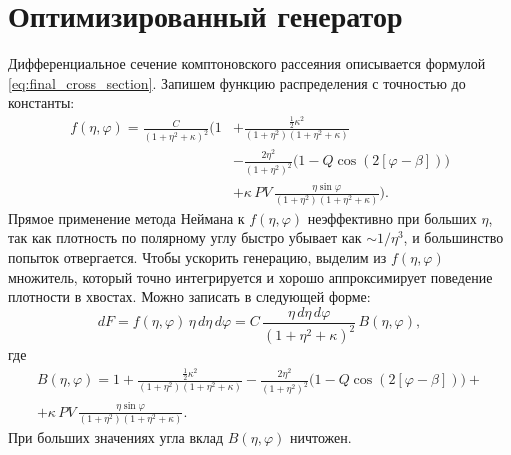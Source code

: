 \documentclass[14pt, a4paper]{extreport}
\begin{document}
\section{Оптимизированный генератор}
Дифференциальное сечение комптоновского рассеяния описывается формулой \eqref{eq:final_cross_section}. Запишем функцию распределения с точностью до константы:
\begin{equation}
\label{eq:density_function}
\begin{aligned}
f(\eta, \varphi) = \frac{C}{\left(1 + \eta^2 + \kappa\right)^2} \Biggl(1 
&+ \frac{\frac{1}{2} \kappa^2}{(1+\eta^2)(1+\eta^2+\kappa)} \\
&- \frac{2\eta^2}{(1+\eta^2)^2}\bigl(1-Q\cos (2[\varphi-\beta])\bigr) \\
&+ \kappa\, PV\, \frac{\eta \sin \varphi}{(1+\eta^2)(1+\eta^2+\kappa)} \Biggr).
\end{aligned}
\end{equation}
Прямое применение метода Неймана к $f(\eta,\varphi)$ неэффективно при больших $\eta$, 
так как плотность по полярному углу быстро убывает как $\sim 1/\eta^3$, и большинство попыток отвергается.
Чтобы ускорить генерацию, выделим из $f(\eta,\varphi)$ множитель, который точно 
интегрируется и хорошо аппроксимирует поведение плотности в хвостах. 
Можно записать в следующей форме:
\begin{equation}
dF = f(\eta, \varphi)\,\eta\, d\eta\, d\varphi = C\,\frac{\eta\, d\eta\, d\varphi}{(1+\eta^2+\kappa)^2}\, B(\eta, \varphi),
\end{equation}
где
\begin{equation}
\begin{aligned}
    B(\eta,\varphi) = 1 + \frac{\frac{1}{2}\kappa^2}{(1+\eta^2)(1+\eta^2+\kappa)} 
- \frac{2\eta^2}{(1+\eta^2)^2}\bigl(1-Q\cos(2[\varphi-\beta])\bigr) 
+\\ 
+\kappa\, PV\, \frac{\eta\sin\varphi}{(1+\eta^2)(1+\eta^2+\kappa)}.
\end{aligned}
\end{equation}
При больших значениях угла вклад $B(\eta, \varphi)$ ничтожен.
\end{document}
